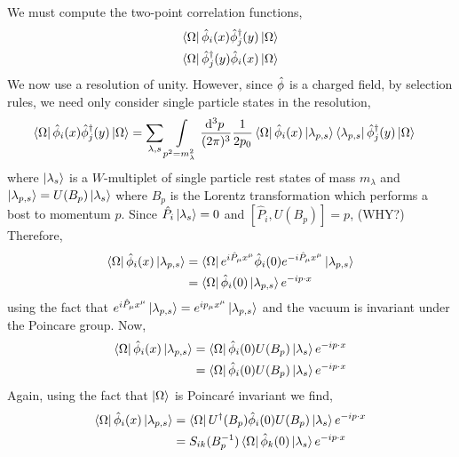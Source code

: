 \documentclass[12pt]{extarticle}
\newcommand{\dn}[2]{ \mathrm{d}^{#1} #2 \:}
\theoremstyle{definition}
\begin{document}
We must compute the two-point correlation functions,
\begin{subequations}
\begin{align}
\left< \Omega \right| \hat{\phi}_i(x) \hat{\phi}^\dagger_j(y) \left| \Omega \right> &
\\
\left< \Omega \right| \hat{\phi}^\dagger_j(y) \hat{\phi}_i(x) \left| \Omega \right> &
\end{align}
\end{subequations}
We now use a resolution of unity. However, since $\hat{\phi}$ is a charged field, by selection rules, we need only consider single particle states in the resolution,
\begin{subequations}
\begin{align}
\bra{\Omega} \ph_i(x) \phd_j(y) \ket{\Omega} & = \sum_{\lambda, s} \int\limits_{p^2 = m_\lambda^2} \frac{\dn{3}{p}}{(2 \pi)^3} \frac{1}{2 p_0} \bra{\Omega} \ph_i(x) \ket{\lambda_{p,s}} \bra{\lambda_{p,s}} \phd_j(y) \ket{\Omega}
\end{align}
\end{subequations}
where $\left| \lambda_{s} \right>$ is a $W$-multiplet of single particle rest states of mass $m_\lambda$ and $\left| \lambda_{p,s} \right> = U(B_p) \left| \lambda_s \right>$ where $B_p$ is the Lorentz transformation which performs a bost to momentum $p$. Since $\hat{P}_i \left| \lambda_s \right> = 0$ and $[\hat{P}_i, U(B_p)] = p$, (WHY?)
Therefore,
\begin{subequations}
\begin{align}
\left< \Omega \right| \hat{\phi}_i(x) \left| \lambda_{p,s} \right> & = \left< \Omega \right| e^{i \hat{P}_\mu x^\mu} \hat{\phi}_i(0) e^{-i \hat{P}_\mu x^\mu} \left| \lambda_{p,s} \right>
\\
& = \left< \Omega \right| \hat{\phi}_i(0) \left| \lambda_{p,s} \right> e^{- i p \cdot x}
\end{align}
\end{subequations}
using the fact that $e^{i \hat{P}_\mu x^\mu} \left| \lambda_{p,s} \right> = e^{i p_\mu x^\mu} \left| \lambda_{p,s} \right>$ and the vacuum is invariant under the Poincare group. Now,
\begin{subequations}
\begin{align}
\left< \Omega \right| \hat{\phi}_i(x) \left| \lambda_{p,s} \right> & = 
\left< \Omega \right| \hat{\phi}_i(0) U(B_p) \left| \lambda_{s} \right> e^{- i p \cdot x}
\\
& = \left< \Omega \right| \hat{\phi}_i(0) U(B_p) \left| \lambda_{s} \right> e^{- i p \cdot x}
\end{align}
\end{subequations}
Again, using the fact that $\left| \Omega \right>$ is Poincar\'{e} invariant we find,
\begin{subequations}
\begin{align}
\left< \Omega \right| \hat{\phi}_i(x) \left| \lambda_{p,s} \right>
& = \left< \Omega \right| U^\dagger(B_p) \hat{\phi}_i(0) U(B_p) \left| \lambda_{s} \right> e^{- i p \cdot x}
\\
& =  S_{ik}(B_p^{-1}) \left< \Omega \right| \hat{\phi}_k(0) \left| \lambda_{s} \right> e^{-i p \cdot x}
\end{align}
\end{subequations}
\end{document}
